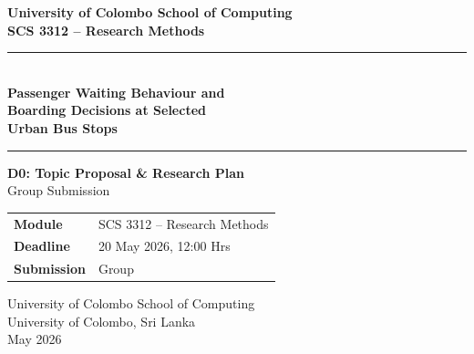 \documentclass[12pt, a4paper]{report}
\begin{document}
\begin{titlepage}
    \centering
    \vspace*{2cm}

    {\Large\bfseries University of Colombo School of Computing\\[0.4em]
    SCS 3312 – Research Methods}

    \vspace{2cm}

    \rule{\linewidth}{0.5pt}\\[0.6em]
    {\LARGE\bfseries Passenger Waiting Behaviour and\\[0.3em]
    Boarding Decisions at Selected\\[0.3em]
    Urban Bus Stops}\\[0.4em]
    \rule{\linewidth}{0.5pt}

    \vspace{1.5cm}

    {\large\textbf{D0: Topic Proposal \& Research Plan}}\\[0.3em]
    {\large Group Submission}

    \vspace{2cm}

    \begin{tabular}{ll}
        \textbf{Module}     & SCS 3312 – Research Methods \\[0.3em]
        \textbf{Deadline}   & 20 May 2026, 12:00 Hrs \\[0.3em]
        \textbf{Submission} & Group \\
    \end{tabular}

    \vfill

    {\large University of Colombo School of Computing\\
    University of Colombo, Sri Lanka}\\[0.5em]
    {\large May 2026}
\end{titlepage}

\setcounter{page}{1}

\setcounter{secnumdepth}{-1}

\end{document}
